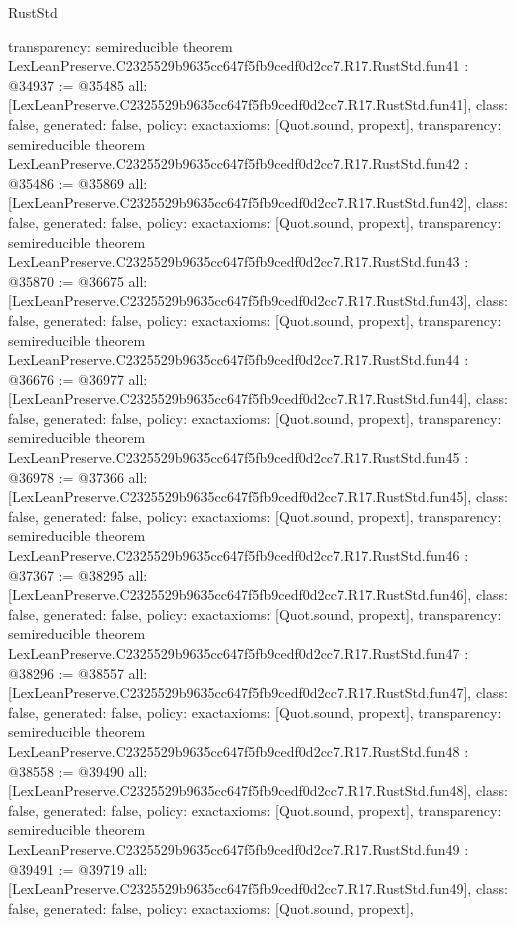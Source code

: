 \begin{lexlean}{RustStd}
\begin{coremodule}
{  transparency: semireducible
}
theorem LexLeanPreserve.C2325529b9635cc647f5fb9cedf0d2cc7.R17.RustStd.fun41 : @34937 := @35485 {
  all: [LexLeanPreserve.C2325529b9635cc647f5fb9cedf0d2cc7.R17.RustStd.fun41],
  class: false,
  generated: false,
  policy: exact{axioms: [Quot.sound, propext]},
  transparency: semireducible
}
theorem LexLeanPreserve.C2325529b9635cc647f5fb9cedf0d2cc7.R17.RustStd.fun42 : @35486 := @35869 {
  all: [LexLeanPreserve.C2325529b9635cc647f5fb9cedf0d2cc7.R17.RustStd.fun42],
  class: false,
  generated: false,
  policy: exact{axioms: [Quot.sound, propext]},
  transparency: semireducible
}
theorem LexLeanPreserve.C2325529b9635cc647f5fb9cedf0d2cc7.R17.RustStd.fun43 : @35870 := @36675 {
  all: [LexLeanPreserve.C2325529b9635cc647f5fb9cedf0d2cc7.R17.RustStd.fun43],
  class: false,
  generated: false,
  policy: exact{axioms: [Quot.sound, propext]},
  transparency: semireducible
}
theorem LexLeanPreserve.C2325529b9635cc647f5fb9cedf0d2cc7.R17.RustStd.fun44 : @36676 := @36977 {
  all: [LexLeanPreserve.C2325529b9635cc647f5fb9cedf0d2cc7.R17.RustStd.fun44],
  class: false,
  generated: false,
  policy: exact{axioms: [Quot.sound, propext]},
  transparency: semireducible
}
theorem LexLeanPreserve.C2325529b9635cc647f5fb9cedf0d2cc7.R17.RustStd.fun45 : @36978 := @37366 {
  all: [LexLeanPreserve.C2325529b9635cc647f5fb9cedf0d2cc7.R17.RustStd.fun45],
  class: false,
  generated: false,
  policy: exact{axioms: [Quot.sound, propext]},
  transparency: semireducible
}
theorem LexLeanPreserve.C2325529b9635cc647f5fb9cedf0d2cc7.R17.RustStd.fun46 : @37367 := @38295 {
  all: [LexLeanPreserve.C2325529b9635cc647f5fb9cedf0d2cc7.R17.RustStd.fun46],
  class: false,
  generated: false,
  policy: exact{axioms: [Quot.sound, propext]},
  transparency: semireducible
}
theorem LexLeanPreserve.C2325529b9635cc647f5fb9cedf0d2cc7.R17.RustStd.fun47 : @38296 := @38557 {
  all: [LexLeanPreserve.C2325529b9635cc647f5fb9cedf0d2cc7.R17.RustStd.fun47],
  class: false,
  generated: false,
  policy: exact{axioms: [Quot.sound, propext]},
  transparency: semireducible
}
theorem LexLeanPreserve.C2325529b9635cc647f5fb9cedf0d2cc7.R17.RustStd.fun48 : @38558 := @39490 {
  all: [LexLeanPreserve.C2325529b9635cc647f5fb9cedf0d2cc7.R17.RustStd.fun48],
  class: false,
  generated: false,
  policy: exact{axioms: [Quot.sound, propext]},
  transparency: semireducible
}
theorem LexLeanPreserve.C2325529b9635cc647f5fb9cedf0d2cc7.R17.RustStd.fun49 : @39491 := @39719 {
  all: [LexLeanPreserve.C2325529b9635cc647f5fb9cedf0d2cc7.R17.RustStd.fun49],
  class: false,
  generated: false,
  policy: exact{axioms: [Quot.sound, propext]},
}
\end{coremodule}
\end{lexlean}
